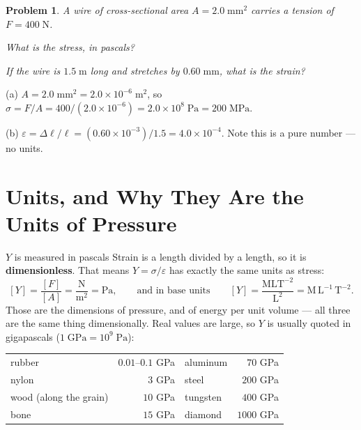 \documentclass[11pt]{article}
\newcommand{\clearpts}{\addtocounter{tpts}{\value{cpts}} \setcounter{cpts}{0}}
\newcommand{\pts}[1]{\clearpts \setcounter{cpts}{#1}}
\theoremstyle{mystyle}
\newtheorem{pproblem}{Problem}
\begin{document}
\pts{3}
\begin{pproblem}
A wire of cross-sectional area $A = 2.0\;\mathrm{mm}^2$ carries a tension of
$F = 400\;\mathrm{N}$.
\begin{subpart}
\item What is the stress, in pascals?
\item If the wire is $1.5\;\mathrm{m}$ long and stretches by $0.60\;\mathrm{mm}$, what is
the strain?
\end{subpart}
\end{pproblem}
\begin{solution}
(a) $A = 2.0\;\mathrm{mm}^2 = 2.0\times10^{-6}\;\mathrm{m}^2$, so
$\sigma = F/A = 400 / (2.0\times 10^{-6}) = 2.0\times 10^{8}\;\mathrm{Pa}
= 200\;\mathrm{MPa}$.

(b) $\varepsilon = \Delta \ell/\ell = (0.60\times10^{-3})/1.5 = 4.0\times 10^{-4}$. Note
this is a pure number --- no units.
\end{solution}

\section{Units, and Why They Are the Units of Pressure}

\begin{psidea}{$Y$ is measured in pascals}{}
Strain is a length divided by a length, so it is \textbf{dimensionless}. That means
$Y = \sigma/\varepsilon$ has exactly the same units as stress:
\[
[Y] = \frac{[F]}{[A]} = \frac{\mathrm{N}}{\mathrm{m}^2} = \mathrm{Pa},
\qquad\text{and in base units}\qquad
[Y] = \frac{\mathrm{M}\mathrm{L}\mathrm{T}^{-2}}{\mathrm{L}^2} = \mathrm{M}\, \mathrm{L}^{-1}\, \mathrm{T}^{-2}.
\]
Those are the dimensions of pressure, and of energy per unit volume --- all three are the
same thing dimensionally. Real values are large, so $Y$ is usually quoted in gigapascals
($1\;\mathrm{GPa} = 10^9\;\mathrm{Pa}$):
\begin{center}
\begin{tabular}{lr@{\qquad}lr}
rubber & $0.01$--$0.1$ GPa & aluminum & $70$ GPa\\
nylon & $3$ GPa & steel & $200$ GPa\\
wood (along the grain) & $10$ GPa & tungsten & $400$ GPa\\
bone & $15$ GPa & diamond & $1000$ GPa\\
\end{tabular}
\end{center}
\end{psidea}
\end{document}
